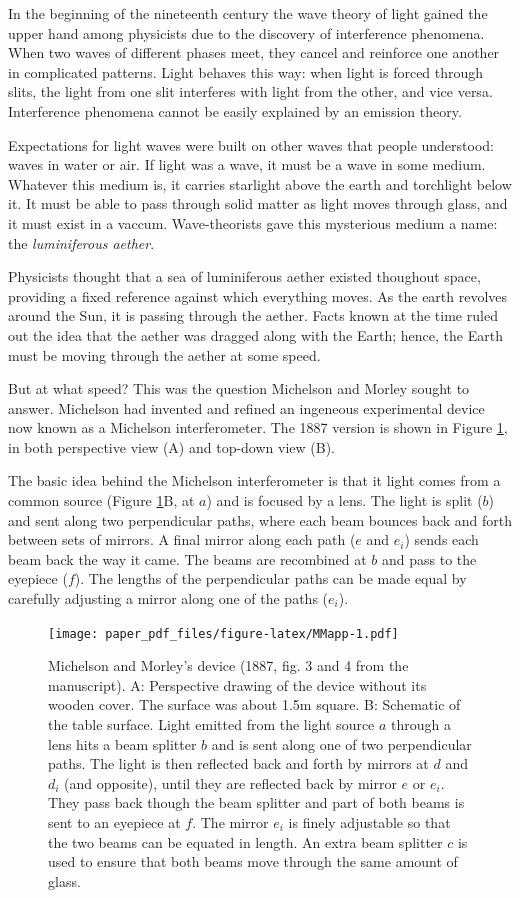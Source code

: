 \documentclass[english,floatsintext,man]{apa6}
\theoremstyle{definition}
\theoremstyle{definition}
\theoremstyle{definition}
\theoremstyle{remark}
\begin{document}
In the beginning of the nineteenth century the wave theory of light
gained the upper hand among physicists due to the discovery of
interference phenomena. When two waves of different phases meet, they
cancel and reinforce one another in complicated patterns. Light behaves
this way: when light is forced through slits, the light from one slit
interferes with light from the other, and vice versa. Interference
phenomena cannot be easily explained by an emission theory.

Expectations for light waves were built on other waves that people
understood: waves in water or air. If light was a wave, it must be a
wave in some medium. Whatever this medium is, it carries starlight above
the earth and torchlight below it. It must be able to pass through solid
matter as light moves through glass, and it must exist in a vaccum.
Wave-theorists gave this mysterious medium a name: the
\emph{luminiferous aether}.

Physicists thought that a sea of luminiferous aether existed thoughout
space, providing a fixed reference against which everything moves. As
the earth revolves around the Sun, it is passing through the aether.
Facts known at the time ruled out the idea that the aether was dragged
along with the Earth; hence, the Earth must be moving through the aether
at some speed.

But at what speed? This was the question Michelson and Morley sought to
answer. Michelson had invented and refined an ingeneous experimental
device now known as a Michelson interferometer. The 1887 version is
shown in Figure \ref{fig:MMapp}, in both perspective view (A) and
top-down view (B).

The basic idea behind the Michelson interferometer is that it light
comes from a common source (Figure \ref{fig:MMapp}B, at \(a\)) and is
focused by a lens. The light is split (\(b\)) and sent along two
perpendicular paths, where each beam bounces back and forth between sets
of mirrors. A final mirror along each path (\(e\) and \(e_i\)) sends
each beam back the way it came. The beams are recombined at \(b\) and
pass to the eyepiece (\(f\)). The lengths of the perpendicular paths can
be made equal by carefully adjusting a mirror along one of the paths
(\(e_i\)).

\begin{figure}
\centering
\texttt{[image: paper\_pdf\_files/figure-latex/MMapp-1.pdf]}
\caption{\label{fig:MMapp}Michelson and Morley's device (1887, fig. 3 and 4
from the manuscript). A: Perspective drawing of the device without its
wooden cover. The surface was about 1.5m square. B: Schematic of the
table surface. Light emitted from the light source \(a\) through a lens
hits a beam splitter \(b\) and is sent along one of two perpendicular
paths. The light is then reflected back and forth by mirrors at \(d\)
and \(d_i\) (and opposite), until they are reflected back by mirror
\(e\) or \(e_i\). They pass back though the beam splitter and part of
both beams is sent to an eyepiece at \(f\). The mirror \(e_i\) is finely
adjustable so that the two beams can be equated in length. An extra beam
splitter \(c\) is used to ensure that both beams move through the same
amount of glass.}
\end{figure}
\end{document}

